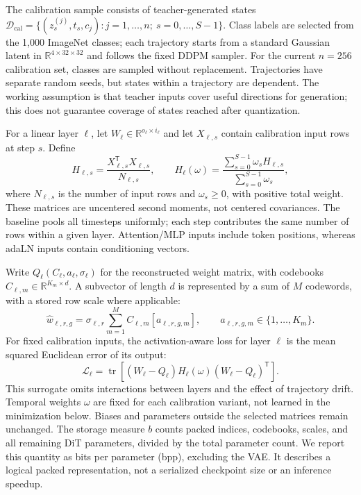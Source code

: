 \documentclass{article}
\begin{document}
The calibration sample consists of teacher-generated states $\mathcal D_{\mathrm{cal}}=\{(z_s^{(j)},t_s,c_j):j=1,\ldots,n;\ s=0,\ldots,S-1\}$. Class labels are selected from the 1,000 ImageNet classes; each trajectory starts from a standard Gaussian latent in $\mathbb R^{4\times32\times32}$ and follows the fixed DDPM sampler. For the current $n=256$ calibration set, classes are sampled without replacement. Trajectories have separate random seeds, but states within a trajectory are dependent. The working assumption is that teacher inputs cover useful directions for generation; this does not guarantee coverage of states reached after quantization.

For a linear layer $\ell$, let $W_\ell\in\mathbb R^{o_\ell\times i_\ell}$ and let $X_{\ell,s}$ contain calibration input rows at step $s$. Define
\begin{equation}
 H_{\ell,s}=\frac{X_{\ell,s}^{\mathsf T}X_{\ell,s}}{N_{\ell,s}},\qquad
 H_\ell(\omega)=\frac{\sum_{s=0}^{S-1}\omega_s H_{\ell,s}}{\sum_{s=0}^{S-1}\omega_s},
 \label{eq:xtx}
\end{equation}
where $N_{\ell,s}$ is the number of input rows and $\omega_s\geq0$, with positive total weight. These matrices are uncentered second moments, not centered covariances. The baseline pools all timesteps uniformly; each step contributes the same number of rows within a given layer. Attention/MLP inputs include token positions, whereas adaLN inputs contain conditioning vectors.

Write $Q_\ell(C_\ell,a_\ell,\sigma_\ell)$ for the reconstructed weight matrix, with codebooks $C_{\ell,m}\in\mathbb R^{K_m\times d}$. A subvector of length $d$ is represented by a sum of $M$ codewords, with a stored row scale where applicable:
\begin{equation}
 \widehat w_{\ell,r,g}=\sigma_{\ell,r}\sum_{m=1}^{M}C_{\ell,m}[a_{\ell,r,g,m}],
 \qquad a_{\ell,r,g,m}\in\{1,\ldots,K_m\}.
 \label{eq:vq}
\end{equation}
For fixed calibration inputs, the activation-aware loss for layer $\ell$ is the mean squared Euclidean error of its output:
\begin{equation}
 \mathcal L_\ell=\operatorname{tr}\!\left[(W_\ell-Q_\ell)H_\ell(\omega)(W_\ell-Q_\ell)^{\mathsf T}\right].
 \label{eq:layerloss}
\end{equation}
This surrogate omits interactions between layers and the effect of trajectory drift. Temporal weights $\omega$ are fixed for each calibration variant, not learned in the minimization below. Biases and parameters outside the selected matrices remain unchanged. The storage measure $b$ counts packed indices, codebooks, scales, and all remaining DiT parameters, divided by the total parameter count. We report this quantity as bits per parameter (bpp), excluding the VAE. It describes a logical packed representation, not a serialized checkpoint size or an inference speedup.
\end{document}

